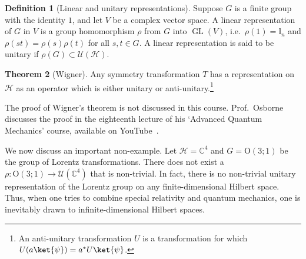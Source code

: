 \documentclass[a4 paper, 12pt, oneside]{book}
\theoremstyle{definition}
\newtheorem{theorem}{Theorem}[section]
\newtheorem{definition}[theorem]{Definition}
\newcommand{\cc}{\mathbb{C}}
\newcommand{\ii}{\mathbb{I}}
\DeclareMathOperator{\GL}{GL}
\newcommand{\hilbert}{\mathcal{H}}
\newcommand{\unitary}{\mathcal{U}}
\newcommand{\ortho}{\mathrm{O}}
\newcommand{\lorentz}{\ortho{(3;1)}}
\begin{document}
	\begin{definition}[Linear and unitary representations]
		Suppose \(G\) is a finite group with the identity \(1\), and let \(V\) be a complex vector space. A linear representation of \(G\) in \(V\) is a group homomorphism \(\rho\) from \(G\) into \(\GL(V)\), i.e.\ \(\rho(1) = \ii_n\) and \(\rho(st) = \rho(s) \rho(t)\) for all \(s, t \in G\). A linear representation is said to be unitary if \(\rho(G) \subset \unitary(\hilbert)\).
	\end{definition}
	\begin{theorem}[Wigner]
		Any symmetry transformation \(T\) has a representation on \(\hilbert\) as an operator which is either unitary or anti-unitary.\footnote{An anti-unitary transformation \(U\) is a transformation for which \(U(a\ket{\psi}) = a^* U\ket{\psi}\).}
	\end{theorem}
	The proof of Wigner's theorem is not discussed in this course. Prof.\ Osborne discusses the proof in the eighteenth lecture of his `Advanced Quantum Mechanics' course, available on YouTube~\cite{Osborne_wigner}.

	We now discuss an important non-example. Let \(\hilbert = \cc^4\) and \(G = \lorentz\) be the group of Lorentz transformations. There does not exist a \(\rho \colon \lorentz \rightarrow \unitary(\cc^4)\) that is non-trivial. In fact, there is no non-trivial unitary representation of the Lorentz group on any finite-dimensional Hilbert space. Thus, when one tries to combine special relativity and quantum mechanics, one is inevitably drawn to infinite-dimensional Hilbert spaces.

	\nocite{*}
	\printbibliography[heading=bibintoc]
	\printindex
\end{document}
